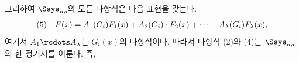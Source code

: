 
그리하여 $\Ssys_{n\rho}$의 모든 다항식은 다음 표현을 갖는다.
\[
\begin{array}{@{}l@{\quad}c@{}}
(5)& F(x)=A_1(G_i)F_1(x)+A_2(G_i)\cdot F_2(x)+\cdots+A_\lambda(G_i)F_\lambda(x),
\end{array}
\]
여기서 $A_1\rcdots A_\lambda$는 $G_i(x)$의 다항식이다. 따라서 다항식 (2)와 (4)는 $\Ssys_{n\rho}$의 한 정기저를 이룬다. 즉,
